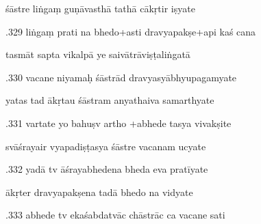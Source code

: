\documentclass[article,12pt,a4paper]{memoir}%
\newcounter{parCount}
\begin{document}
	  
	  \pstart \leavevmode%
	śāstre liṅgaṃ guṇāvasthā tathā cākṛtir iṣyate 
	{}
	\pend%
      

	  
	  \pstart {}.329 liṅgaṃ prati na bhedo+asti dravyapakṣe+api kaś cana 
	{}
	\pend%
      

	  
	  \pstart \leavevmode%
	tasmāt sapta vikalpā ye saivātrāviṣṭaliṅgatā 
	{}
	\pend%
      

	  
	  \pstart {}.330 vacane niyamaḥ śāstrād   dravyasyābhyupagamyate 
	{}
	\pend%
      

	  
	  \pstart \leavevmode%
	yatas tad ākṛtau śāstram anyathaiva samarthyate 
	{}
	\pend%
      

	  
	  \pstart {}.331 vartate yo bahuṣv artho +abhede tasya vivakṣite 
	{}
	\pend%
      

	  
	  \pstart \leavevmode%
	svāśrayair vyapadiṣṭasya śāstre vacanam ucyate 
	{}
	\pend%
      

	  
	  \pstart {}.332 yadā tv āśrayabhedena bheda eva pratīyate 
	{}
	\pend%
      

	  
	  \pstart \leavevmode%
	ākṛter dravyapakṣena tadā bhedo na vidyate 
	{}
	\pend%
      

	  
	  \pstart {}.333 abhede tv ekaśabdatvāc chāstrāc ca vacane sati 
	{}
	\pend%
      
\end{document}
